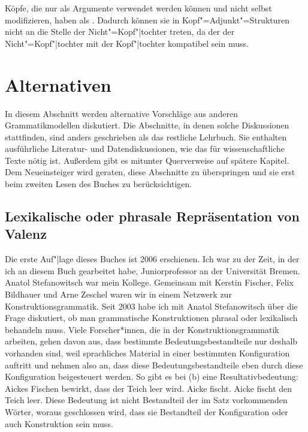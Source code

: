 Köpfe, die nur als Argumente verwendet werden können und nicht selbst modifizieren,
haben als \modw {}. Dadurch können sie in Kopf"=Adjunkt"=Strukturen nicht an die Stelle
der Nicht"=Kopf"|tochter treten, da der \modw der Nicht"=Kopf"|tochter mit der Kopf"|tochter kompatibel
sein muss.



\section{Alternativen}

In diesem Abschnitt werden alternative Vorschläge aus anderen Grammatikmodellen diskutiert.
Die Abschnitte, in denen solche Diskussionen stattfinden, sind anders geschrieben als das restliche
Lehrbuch. Sie enthalten ausführliche Literatur- und Datendiskussionen, wie das für wissenschaftliche
Texte nötig ist. Außerdem gibt es mitunter Querverweise auf spätere Kapitel. Dem Neueinsteiger
wird geraten, diese Abschnitte zu überspringen und sie erst beim zweiten Lesen des Buches zu berücksichtigen.

\subsection{Lexikalische oder phrasale Repräsentation von Valenz}
\label{Abschnitt-phrasale-Valenz}

Die erste Auf"|lage dieses Buches ist 2006 erschienen. Ich war zu der Zeit, in der ich an diesem Buch
gearbeitet habe, Juniorprofessor an der Universität Bremen. Anatol Stefanowitsch war mein
Kollege. Gemeinsam mit Kerstin Fischer, Felix Bildhauer und Arne Zeschel waren wir in einem Netzwerk
zur Konstruktionsgrammatik. Seit 2003 habe ich mit Anatol Stefanowitsch über die Frage diskutiert,
ob man grammatische Konstruktionen phrasal oder lexikalisch behandeln muss. Viele Forscher*innen,
die in der Konstruktionsgrammatik arbeiten, gehen davon aus, dass bestimmte Bedeutungsbestandteile
nur deshalb vorhanden sind, weil sprachliches Material in einer bestimmten Konfiguration auftritt
und nehmen also an, dass diese Bedeutungsbestandteile eben durch diese Konfiguration beigesteuert
werden. So gibt es bei (b) eine Resultativbedeutung: Aickes Fischen bewirkt, dass der Teich
leer wird.
\eal
\ex Aicke fischt.
\ex Aicke fischt den Teich leer.
\zl
Diese Bedeutung ist nicht Bestandteil der im Satz vorkommenden Wörter, woraus geschlossen wird, dass
sie Bestandteil der Konfiguration oder auch Konstruktion sein muss.

